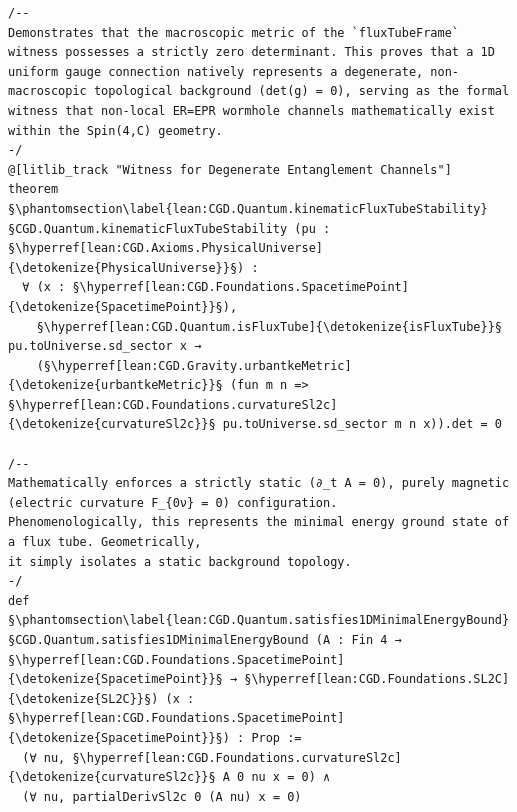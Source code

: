 \begin{verbatim}
/--
Demonstrates that the macroscopic metric of the `fluxTubeFrame` witness possesses a strictly zero determinant. This proves that a 1D uniform gauge connection natively represents a degenerate, non-macroscopic topological background (det(g) = 0), serving as the formal witness that non-local ER=EPR wormhole channels mathematically exist within the Spin(4,C) geometry.
-/
@[litlib_track "Witness for Degenerate Entanglement Channels"]
theorem §\phantomsection\label{lean:CGD.Quantum.kinematicFluxTubeStability}§CGD.Quantum.kinematicFluxTubeStability (pu : §\hyperref[lean:CGD.Axioms.PhysicalUniverse]{\detokenize{PhysicalUniverse}}§) :
  ∀ (x : §\hyperref[lean:CGD.Foundations.SpacetimePoint]{\detokenize{SpacetimePoint}}§),
    §\hyperref[lean:CGD.Quantum.isFluxTube]{\detokenize{isFluxTube}}§ pu.toUniverse.sd_sector x →
    (§\hyperref[lean:CGD.Gravity.urbantkeMetric]{\detokenize{urbantkeMetric}}§ (fun m n => §\hyperref[lean:CGD.Foundations.curvatureSl2c]{\detokenize{curvatureSl2c}}§ pu.toUniverse.sd_sector m n x)).det = 0

/--
Mathematically enforces a strictly static (∂_t A = 0), purely magnetic (electric curvature F_{0ν} = 0) configuration.
Phenomenologically, this represents the minimal energy ground state of a flux tube. Geometrically,
it simply isolates a static background topology.
-/
def §\phantomsection\label{lean:CGD.Quantum.satisfies1DMinimalEnergyBound}§CGD.Quantum.satisfies1DMinimalEnergyBound (A : Fin 4 → §\hyperref[lean:CGD.Foundations.SpacetimePoint]{\detokenize{SpacetimePoint}}§ → §\hyperref[lean:CGD.Foundations.SL2C]{\detokenize{SL2C}}§) (x : §\hyperref[lean:CGD.Foundations.SpacetimePoint]{\detokenize{SpacetimePoint}}§) : Prop :=
  (∀ nu, §\hyperref[lean:CGD.Foundations.curvatureSl2c]{\detokenize{curvatureSl2c}}§ A 0 nu x = 0) ∧
  (∀ nu, partialDerivSl2c 0 (A nu) x = 0)



\end{verbatim}
